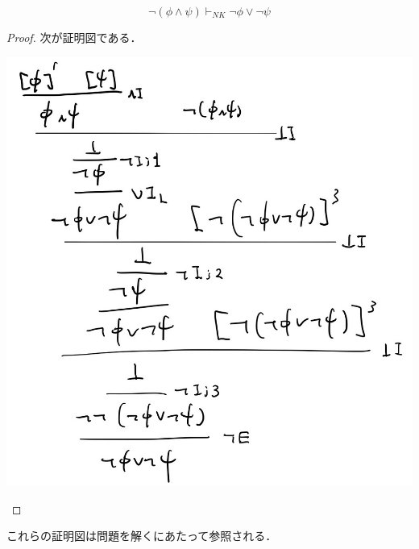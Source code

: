 \documentclass[uplatex,dvipdfmx]{jsarticle}
\begin{document}
\begin{lemma}
    \[ \lnot(\phi\land\psi)\vdash_{NK}\lnot\phi\lor\lnot\psi \]
\end{lemma}
\begin{proof}
    次が証明図である．
    \begin{center}
        \includegraphics[width=15cm]{figure4.jpg}
    \end{center}
\end{proof}

これらの証明図は問題を解くにあたって参照される．
\end{document}

